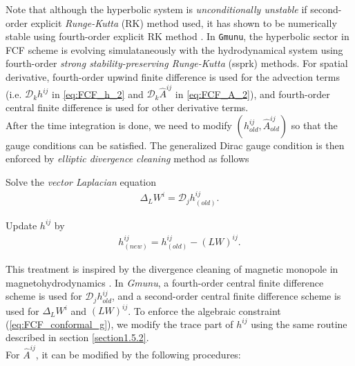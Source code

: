 Note that although the hyperbolic system is \textit{unconditionally unstable} if second-order explicit \textit{Runge-Kutta} (RK) method used,
it has shown to be numerically stable using fourth-order explicit RK method \cite{cordero2012partially,shibata2015numerical}.
In \texttt{Gmunu}, the hyperbolic sector in FCF scheme is evolving simulataneously with the hydrodynamical system using 
fourth-order \textit{strong stability-preserving Runge-Kutta} (ssprk) methods.
For spatial derivative, fourth-order upwind finite difference is used for the advection terms \cite{shibata2015numerical}
(i.e. $\mathcal{D}_k h^{ij}$ in \cref{eq:FCF_h_2} and $\mathcal{D}_k \hat{A}^{ij}$ in \cref{eq:FCF_A_2}),
and fourth-order central finite difference is used for other derivative terms.\\
After the time integration is done,
we need to modify $\left(h^{ij}_{old}, \hat{A}^{ij}_{old}\right)$ so that the gauge conditions can be satisfied.
The generalized Dirac gauge condition is then enforced by \textit{elliptic divergence cleaning} method as follows
\begin{Step}
    \item Solve the \textit{vector Laplacian} equation
    \begin{align}
        \Delta_L W^i = \mathcal{D}_j h^{ij}_{(old)}.
    \end{align}
    \item Update $h^{ij}$ by
    \begin{align}
        h^{ij}_{(new)} = h^{ij}_{(old)} - \left( L W \right)^{ij}.
    \end{align}
\end{Step}
This treatment is inspired by the divergence cleaning of magnetic monopole in magnetohydrodynamics \cite{balsara2004comparison,teunissen2019geometric,balsara1998total}.
In \textit{Gmunu}, a fourth-order central finite difference scheme is used for $\mathcal{D}_j h^{ij}_{old}$,
and a second-order central finite difference scheme is used for $\Delta_L W^i$ and $\left( L W \right)^{ij}$.
To enforce the algebraic constraint (\ref{eq:FCF_conformal_g}),
we modify the trace part of $h^{ij}$ using the same routine described in section \ref{section1.5.2}.\\
For $\hat{A}^{ij}$, it can be modified by the following procedures:
